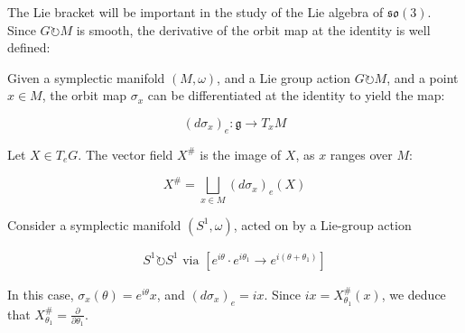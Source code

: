\noindent The Lie bracket will be important in the study of the Lie algebra of $\mathfrak{so}(3)$. Since $G \circlearrowright M$ is smooth, the derivative of the orbit map at the identity is well defined:

\begin{defn}
Given a symplectic manifold $(M, \omega)$, and a Lie group action $G \circlearrowright M$, and a point $x \in M$, the orbit map $\sigma_{x}$ can be differentiated at the identity to yield the map:

$$\left( d \sigma_{x} \right)_{e}: \mathfrak{g} \to T_{x} M$$
\end{defn}

\begin{defn}
Let $X \in T_{e} G$. The vector field $X^{\#}$ is the image of $X$, as $x$ ranges over $M$:

$$X^{\#} = \bigsqcup_{x \in M} \left( d \sigma_{x} \right)_{e}(X) $$
\end{defn}

\begin{example}

Consider a symplectic manifold $(S^{1}, \omega)$, acted on by a Lie-group action 

\begin{align}
S^{1} \circlearrowright S^{1} \text{ via } [e^{i \theta} \cdot e^{i \theta_{1}} \to e^{i(\theta + \theta_{1})} ]
\end{align}

\noindent In this case, $\sigma_{x}(\theta) = e^{i \theta} x$, and $(d \sigma_{x})_{e} = ix$. Since $ix = X^{\#}_{\theta_{1}}(x)$, we deduce that $X^{\#}_{\theta_{1}} = \frac{\partial}{\partial \theta_{1}}$.
\end{example}

\begin{center}

\end{center}

